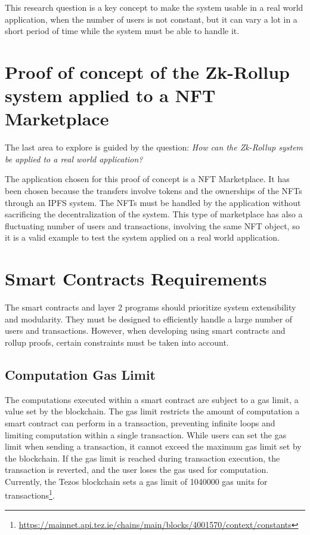 This research question is a key concept to make the system usable in a real world application, when the number of users is not constant, but it can vary a lot in a short period of time while the system must be able to handle it.

\section{Proof of concept of the Zk-Rollup system applied to a NFT Marketplace}
The last area to explore is guided by the question: \textit{How can the Zk-Rollup system be applied to a real world application?}

The application chosen for this proof of concept is a NFT Marketplace. It has been chosen because the transfers involve tokens and the ownerships of the NFTs through an IPFS system. The NFTs must be handled by the application without sacrificing the decentralization of the system. This type of marketplace has also a fluctuating number of users and transactions, involving the same NFT object, so it is a valid example to test the system applied on a real world application.

\section{Smart Contracts Requirements}

The smart contracts and layer 2 programs should prioritize system extensibility and modularity. They must be designed to efficiently handle a large number of users and transactions. However, when developing using smart contracts and rollup proofs, certain constraints must be taken into account.

\subsection{Computation Gas Limit \label{subsec:gasLimit}}

The computations executed within a smart contract are subject to a gas limit, a value set by the blockchain. The gas limit restricts the amount of computation a smart contract can perform in a transaction, preventing infinite loops and limiting computation within a single transaction. While users can set the gas limit when sending a transaction, it cannot exceed the maximum gas limit set by the blockchain. If the gas limit is reached during transaction execution, the transaction is reverted, and the user loses the gas used for computation. Currently, the Tezos blockchain sets a gas limit of 1040000 gas units for transactions\footnote{\url{https://mainnet.api.tez.ie/chains/main/blocks/4001570/context/constants}}.

